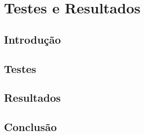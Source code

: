 \chapter{Testes e Resultados}
\label{ch::test-result}

\section{Introdução}
\label{sec::test-result:intro}

\section{Testes}
\label{sec::test-result:testes}

\section{Resultados}
\label{sec::test-result:res}

\section{Conclusão}
\label{sec::test-result:conc}
